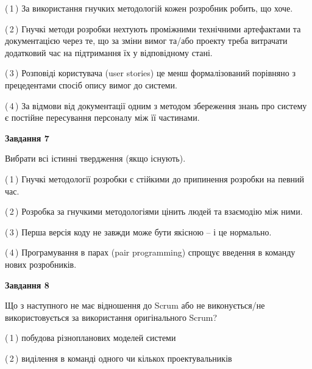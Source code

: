 \documentclass[10pt, ukrainian]{article}
\begin{document}
{\begin {large}
(\,1\,) За використання гнучких методологій кожен розробник робить, що хоче. %



(\,2\,) Гнучкі методи розробки нехтують проміжними технічними артефактами та документацією через те, що за зміни вимог та/або проекту треба витрачати додатковий час на підтримання їх у відповідному стані. %



(\,3\,) Розповіді користувача (user stories) це менш формалізований порівняно з прецедентами спосіб опису вимог до системи. %



(\,4\,) За відмови від документації одним з методом збереження знань про систему є постійне пересування персоналу між її частинами. %


{\begin {center}\textbf{Завдання 7}\end {center}}\par
Вибрати всі істинні твердження (якщо існують).\par
\vspace{2mm}



(\,1\,) Гнучкі методології розробки є стійкими до припинення розробки на певний час. %



(\,2\,) Розробка за гнучкими методологіями цінить людей та взаємодію між ними. %



(\,3\,) Перша версія коду не завжди може бути якісною -- і це нормально. %



(\,4\,) Програмування в парах (pair programming) спрощує введення в команду нових розробників. %


{\begin {center}\textbf{Завдання 8}\end {center}}\par
Що з наступного не має відношення до Scrum або не виконується/не використовується за використання оригінального Scrum?\par
\vspace{2mm}



(\,1\,) побудова різнопланових моделей системи%



(\,2\,) виділення в команді одного чи кількох проектувальників%




\end{large}}
\end{document}
